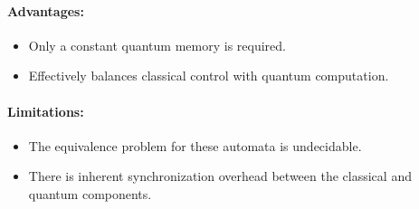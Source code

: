 \paragraph{Advantages:}
\begin{itemize}
    \item Only a constant quantum memory is required.
    \item Effectively balances classical control with quantum computation.
\end{itemize}

\paragraph{Limitations:}
\begin{itemize}
    \item The equivalence problem for these automata is undecidable.
    \item There is inherent synchronization overhead between the classical and quantum components.
\end{itemize}


